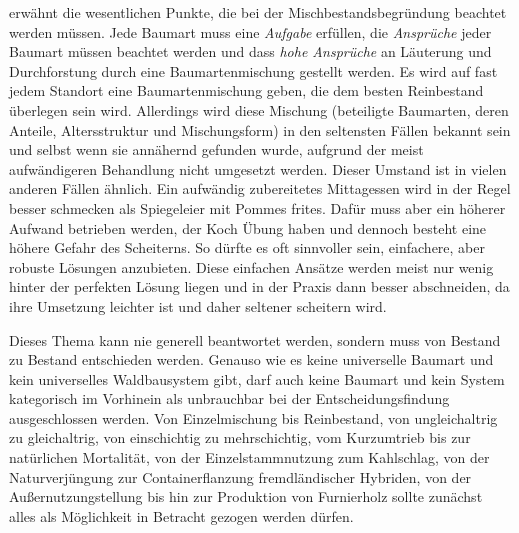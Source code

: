 \documentclass[twocolumn, paper=a4, fontsize=10pt, bibliography=totoc, index=totoc]{scrartcl}
\begin{document}
\citet[S.~218\,f.]{wiedemann1951Ertragskunde} erwähnt die wesentlichen Punkte,
die bei der Mischbestandsbegründung beachtet werden müssen. Jede Baumart muss
eine \emph{Aufgabe} erfüllen, die \emph{Ansprüche} jeder Baumart müssen beachtet
werden und dass \emph{hohe Ansprüche} an Läuterung und Durchforstung durch eine
Baumartenmischung gestellt werden. Es wird auf fast jedem Standort eine
Baumartenmischung geben, die dem besten Reinbestand überlegen sein wird.
Allerdings wird diese Mischung (beteiligte Baumarten, deren Anteile,
Altersstruktur und Mischungsform) in den seltensten Fällen bekannt sein und
selbst wenn sie annähernd gefunden wurde, aufgrund der meist aufwändigeren Behandlung nicht umgesetzt werden.
Dieser Umstand ist in vielen anderen Fällen ähnlich. Ein aufwändig
zubereitetes Mittagessen wird in der Regel besser schmecken als Spiegeleier mit
Pommes frites. Dafür muss aber ein höherer Aufwand betrieben werden, der Koch
Übung haben und dennoch besteht eine höhere Gefahr des Scheiterns. So dürfte es
oft sinnvoller sein, einfachere, aber robuste Lösungen anzubieten. Diese
einfachen Ansätze werden meist nur wenig hinter der perfekten Lösung liegen und
in der Praxis dann besser abschneiden, da ihre Umsetzung leichter ist und daher
seltener scheitern wird.

Dieses Thema kann nie generell beantwortet werden, sondern muss von
Bestand zu Bestand entschieden werden. Genauso wie es keine
universelle Baumart und kein universelles Waldbausystem gibt, darf
auch keine Baumart und kein System kategorisch im Vorhinein als
unbrauchbar bei der Entscheidungsfindung ausgeschlossen werden. Von
Einzelmischung bis Reinbestand, von ungleichaltrig zu gleichaltrig,
von einschichtig zu mehrschichtig, vom Kurzumtrieb bis zur natürlichen
Mortalität, von der Einzelstammnutzung zum Kahlschlag, von der
Naturverjüngung zur Containerflanzung fremdländischer Hybriden, von
der Außernutzungstellung bis hin zur Produktion von Furnierholz
sollte zunächst alles als Möglichkeit in Betracht gezogen werden
dürfen.

\printindex

%
\printbibliography

\end{document}
